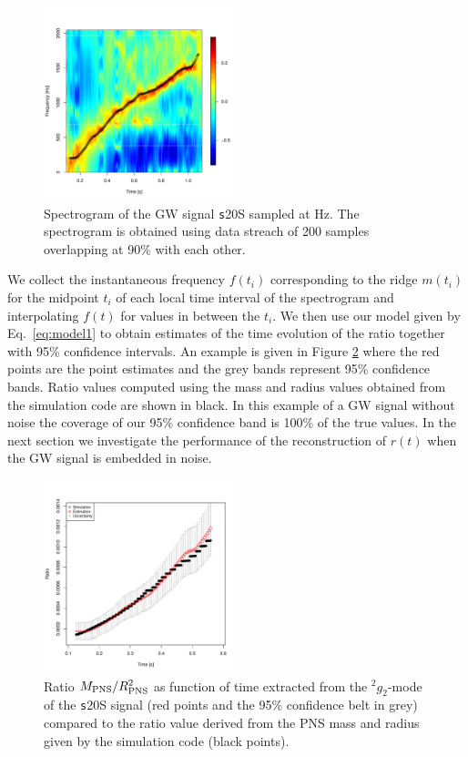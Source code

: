 \begin{figure}
 \centering
 \includegraphics[width=0.5\textwidth]{plots/spectrogram}
 \caption{Spectrogram of the GW signal {\texttt s20S} sampled at \unit[4096]{Hz}.
   The spectrogram is obtained using data streach of 200 samples overlapping at 90\%
   with each other.} \label{fig:spectrogram}
\end{figure}

We collect the instantaneous frequency $f(t_i)$ corresponding to the ridge $m(t_i)$ for
the midpoint $t_i$ of each local time interval of the spectrogram and interpolating $f(t)$
for values in between the $t_i$. We then use our model given by Eq.~\eqref{eq:model1} to obtain
estimates of the time evolution of the ratio together with 95\% confidence intervals.
An example is given in Figure \ref{fig:ratio} where the red points are the point estimates and
the grey bands represent 95\% confidence bands. Ratio values
computed using the mass and radius values obtained from the simulation code 
are shown in black.
In this example of a GW signal without noise the coverage of our 95\% confidence band is 100\%
of the true values.
In the next section we investigate the performance of the reconstruction of $r(t)$ when the GW
signal is embedded in noise.

\begin{figure}
 \centering
 \includegraphics[width=0.5\textwidth]{plots/ratio}
 \caption{Ratio $M_{\rm PNS}/R_{\rm PNS}^2$ as function of time extracted from the $\mbox{}^2 g_2$-mode of the {\texttt s20S} signal (red points and the 95\% confidence belt in grey) compared to the ratio value derived from the PNS mass and radius given by the simulation code (black points).} \label{fig:ratio}
\end{figure}


